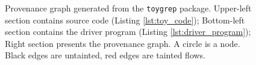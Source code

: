 \begin{figure}[h]
\begin{minipage}{0.34\linewidth}
        \label{fig:corrected-toy-provenance-graph}
    \end{minipage}
    \caption{Provenance graph generated from the \texttt{toygrep} package.
    Upper-left section contains source code (Listing \ref{lst:toy_code}); Bottom-left section contains the driver program (Listing \ref{lst:driver_program}); Right section presents the provenance graph. A circle is a node. Black edges are untainted, red edges are tainted flows.}
    \label{fig:toy-provenance-graph}
    \vspace{-0.5em}
\end{figure}